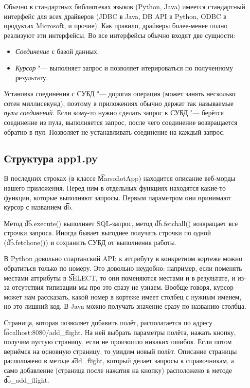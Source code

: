 	Обычно в стандартных библиотеках языков (Python, Java) имеется стандартный
	интерфейс для всех драйверов (JDBC в Java, DB API в Python, ODBC в продуктах Microsoft, и прочие).
	Как правило, драйверы более-менее полно реализуют эти интерфейсы.
	Во все интерфейсы обычно входят две сущности:
	\begin{itemize}
		\item \textit{Соединение} с базой данных.
		\item \textit{Курсор} "--- выполняет запрос и позволяет итерироваться по полученному результату.
	\end{itemize}
	Установка соединения с СУБД "--- дорогая операция (может занять несколько сотен миллисекунд),
	поэтому в приложениях обычно держат так называемые \textit{пулы соединений}.
	Если кому-то нужно сделать запрос к СУБД "--- берётся соединение из пула,
	выполняется запрос, после чего соединение возвращается обратно в пул.
	Позволяет не устанавливать соединение на каждый запрос.

\subsection{Структура app1.py}
	В последних строках (в классе \t{MarsoflotApp}) находится описание веб-морды нашего приложения.
	Перед ним в отдельных функциях находятся какие-то функции, которые выполняют запросы.
	Первым параметром они принимают курсор с названием \t{db}.

	Метод \t{db.execute()} выполняет SQL-запрос, метод \t{db.fetchall()} возвращает все строчки запроса.
	Иногда бывает выгоднее получать строчки по одной (\t{db.fetchone()}) и сохранить СУБД от выполнения работы.

	В Python довольно спартанский API; к аттрибуту в конкретном кортеже можно обратиться только по номеру.
	Это довольно неудобно: например, если поменять местами аттрибуты в \t{SELECT}, то они
	поменяются местами и в результате, и из-за отсутствия типизации мы про это сразу не узнаем.
	Вообще говоря, курсор может нам рассказать, какой номер в кортеже имеет столбец с нужным именем,
	но это лишний код.
	В Java можно получать значение сразу по названию столбца.

	Страница, которая позволяет добавить полёт, располагается по адресу \t{localhost:8080/add\_flight}.
	На ней выбрать параметры полёта, нажать кнопку, получим пустую страницу, если не произошло никаких ошибок.
	Если потом вернёмся на основную страницу, то увидим новый полёт.
	Описание страницы расположено в методе \t{add\_flight}, который делает запросы к справочникам,
	а само добавление (страница после нажатия на кнопку) расположено в методе \t{do\_add\_flight}.

